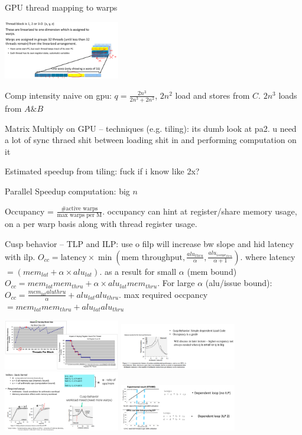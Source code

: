 \documentclass[letter,8pt,landscape]{article}
\begin{document}
\begin{multicols}{3}
  GPU thread mapping to warps
  \begin{center}
    \includegraphics[width=2in]{images/thread-mapping-warp.jpg}
  \end{center}

  Comp intensity naive on gpu: $q = \frac{2n^3}{2n^3 + 2n^2}$, $2n^2$ load and
  stores from $C$. $2n^3$ loads from $A\&B$

  Matrix Multiply on GPU – techniques (e.g. tiling): its dumb look at pa2. u
  need a lot of sync thraed shit between loading shit in and performing
  computation on it

  Estimated speedup from tiling: fuck if i know like 2x?

  Parallel Speedup computation: big $n$

  Occupancy = $\frac{\text{\# active warps}}{\text{max warps per M}}$.
  occupancy can hint at register/share memory usage, on a per warp basis along
  with thread register usage.

  Cusp behavior – TLP and ILP: use o filp will increase bw slope and hid latency
  with ilp. 
  $O_{cc} = \text{latency} \times \min(\text{mem throughput},
  \frac{alu_{thru}}{\alpha}, \frac{alu_{issue_{thru}}}{\alpha + 1})$. where
  latency $= (mem_{lat} + \alpha \times alu_{lat})$. as a result for small
  $\alpha$ (mem bound) $O_{cc} = mem_{lat}mem_{thru} + \alpha \times
  alu_{lat}mem_{thru}$. For large $\alpha$ (alu/issue bound): $O_{cc} =
  \frac{mem_{lat}alu{thru}}{\alpha} +  alu_{lat}alu_{thru}$. max required
  occpancy $= mem_{lat}mem_{thru} + alu_{lat}alu_{thru}$
  \begin{center}
    \includegraphics[width=2in]{images/occupancy-drop.jpg}
    \includegraphics[width=2in]{images/cusp.jpg}
    \includegraphics[width=2in]{images/gpu-hit-lat.jpg}
    \includegraphics[width=2in]{images/ilp-thru.jpg}
  \end{center}


\end{multicols}
\end{document}
